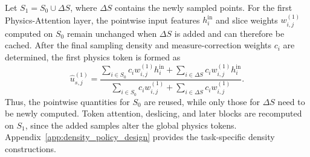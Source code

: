 Let $S_1=S_0\cup\Delta S$, where $\Delta S$ contains the newly sampled points.
For the first Physics-Attention layer, the pointwise input features
$h_i^{\mathrm{in}}$ and slice weights $w_{i,j}^{(1)}$ computed on $S_0$
remain unchanged when $\Delta S$ is added and can therefore be cached.
After the final sampling density and measure-correction weights $c_i$ are
determined, the first physics token is formed as
\begin{equation}
    \widehat{u}_{s,j}^{(1)}
    =
    \frac{
        \sum_{i\in S_0} c_i w_{i,j}^{(1)}h_i^{\mathrm{in}}
        +
        \sum_{i\in\Delta S} c_i w_{i,j}^{(1)}h_i^{\mathrm{in}}
    }{
        \sum_{i\in S_0} c_i w_{i,j}^{(1)}
        +
        \sum_{i\in\Delta S} c_i w_{i,j}^{(1)}
    } .
    \label{eq:cache_aware_aggregation}
\end{equation}
Thus, the pointwise quantities for $S_0$ are reused, while only those for
$\Delta S$ need to be newly computed. Token attention, deslicing, and later
blocks are recomputed on $S_1$, since the added samples alter the global
physics tokens. Appendix~\ref{app:density_policy_design} provides the
task-specific density constructions.
